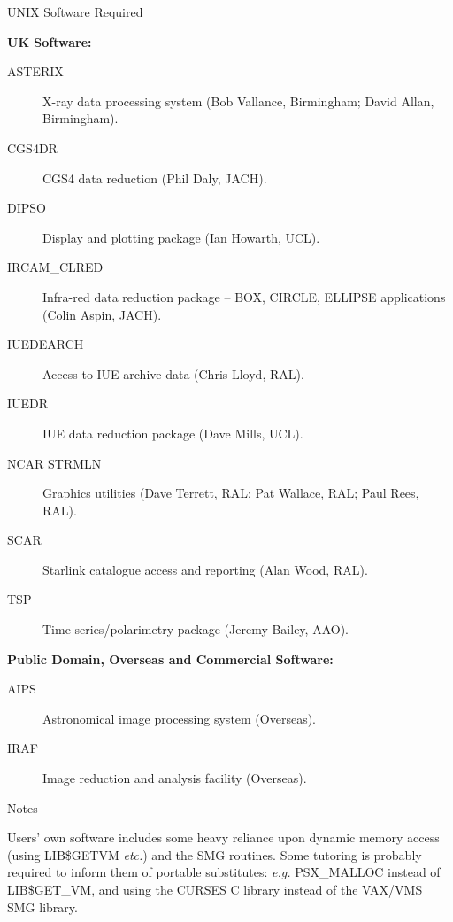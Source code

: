 \vspace{5mm}
\begin{center}
{\large\sc UNIX Software Required}
\end{center}

\begin{center}
{\bf UK Software:}
\end{center}

\begin{description}
\item[ASTERIX] X-ray data processing system (Bob Vallance, Birmingham;
David Allan, Birmingham).
\item[CGS4DR] CGS4 data reduction (Phil Daly, JACH).
\item[DIPSO] Display and plotting package (Ian Howarth, UCL).
\item[IRCAM\_CLRED] Infra-red data reduction package -- BOX, CIRCLE, ELLIPSE
applications (Colin Aspin, JACH).
\item[IUEDEARCH] Access to IUE archive data (Chris Lloyd, RAL).
\item[IUEDR] IUE data reduction package (Dave Mills, UCL).
\item[NCAR STRMLN] Graphics utilities (Dave Terrett, RAL; Pat Wallace, RAL;
Paul Rees, RAL).
\item[SCAR] Starlink catalogue access and reporting (Alan Wood, RAL).
\item[TSP] Time series/polarimetry package (Jeremy Bailey, AAO).
\end{description}


\vspace{5mm}
\begin{center}
{\bf Public Domain, Overseas and Commercial Software:}
\end{center}

\begin{description}
\item[AIPS] Astronomical image processing system (Overseas).
\item[IRAF] Image reduction and analysis facility (Overseas).
\end{description}


\vspace{5mm}
\begin{center}
{\large\sc Notes}
\end{center}

Users' own software includes some heavy reliance upon dynamic memory access
(using LIB\$GETVM {\em etc.}) and the SMG routines.
Some tutoring is probably required to inform them of portable substitutes:
{\em e.g.} PSX\_MALLOC instead of LIB\$GET\_VM, and using the CURSES C library
instead of the VAX/VMS SMG library.

